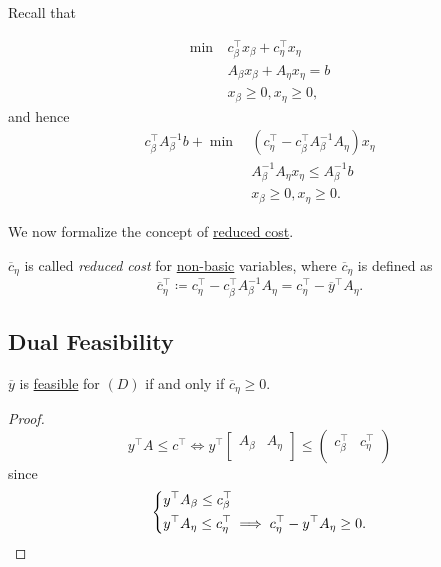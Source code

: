 Recall that
\begin{prev}
	\begin{align*}
		\min~ & c^{\top}_{\beta}x_{\beta} + c^{\top}_{\eta}x_{\eta} \\
		      & A_{\beta}x_{\beta} + A_{\eta}x_{\eta} = b           \\
		      & x_{\beta}\geq 0, x_{\eta}\geq 0,
	\end{align*}
	and hence
	\begin{align*}
		c^{\top}_{\beta}A^{-1}_{\beta}b + \min~ & (c_{\eta}^{\top} - c_{\beta}^{\top}A^{-1}_{\beta}A_{\eta})x_{\eta} \\
		                                        & A^{-1}_{\beta}A_{\eta}x_{\eta} \leq A^{-1}_{\beta}b                \\
		                                        & x_{\beta}\geq 0, x_{\eta}\geq 0.
	\end{align*}
\end{prev}

We now formalize the concept of \hyperref[note:reduced-cost]{reduced cost}.
\begin{definition}\label{def:reduced-cost}
	\(\overline{c}_{\eta}\) is called \emph{reduced cost} for \hyperref[def:non-basic]{non-basic} variables, where \(\overline{c}_{\eta}\) is defined as
	\[
		\overline{c}_{\eta}^{\top} \coloneqq c_{\eta}^{\top} - c_{\beta}^{\top} A^{-1}_{\beta}A_{\eta} = c_{\eta}^{\top} - \overline{y}^{\top}A_{\eta}.
	\]
\end{definition}

\subsection{Dual Feasibility}
\begin{lemma}\label{lma:lec7-2}
	\(\overline{y}\) is \hyperref[def:feasible-solution]{feasible} for \((D)\) if and only if \(\overline{c}_{\eta}\geq 0\).
\end{lemma}
\begin{proof}
	\[
		y^{\top}A\leq c^{\top} \iff y^{\top}\begin{bmatrix}
			A_{\beta} & A_{\eta} \\
		\end{bmatrix}\leq \begin{pmatrix}
			c_{\beta}^{\top} & c_{\eta}^{\top} \\
		\end{pmatrix}
	\]
	since
	\[
		\begin{dcases}
			y^{\top} A_{\beta} \leq c_{\beta}^{\top} \\
			y^{\top} A_{\eta}  \leq c_{\eta}^{\top} \implies c_{\eta}^{\top} - y^{\top}A_{\eta}\geq 0.
		\end{dcases}
	\]
\end{proof}

